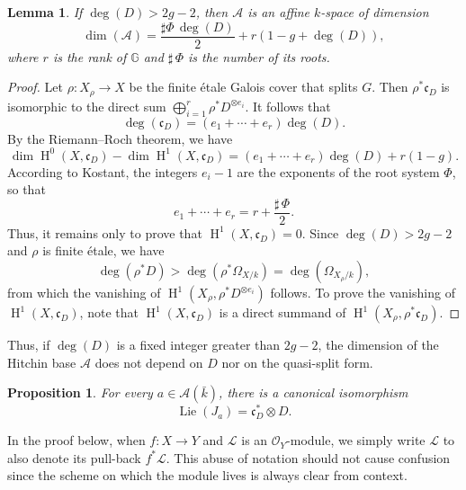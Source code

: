 \documentclass[12pt,english]{smfart}
\numberwithin{equation}{subsection}
\newtheorem{lemma}[equation]{Lemma}
\newtheorem{proposition}[equation]{Proposition}
\theoremstyle{remark}
\begin{document}
\begin{lemma}\label{dim A}
If $\deg(D)>2g-2$, then $\mathcal{A}$ is an affine $k$-space of dimension
$$
\dim(\mathcal{A})=\frac{\sharp\Phi\,\deg(D)}{2}+r(1-g+\deg(D)),
$$
where $r$ is the rank of $\mathbb{G}$ and $\sharp\,\Phi$ is the number of its roots.
\end{lemma}

\begin{proof}
Let $\rho:X_\rho\rightarrow X$ be the finite \'etale Galois cover that splits $G$. Then
$\rho^*\mathfrak{c}_D$ is isomorphic to the direct sum $\bigoplus_{i=1}^r \rho^*D^{\otimes e_i}$.
It follows that
$$
\deg(\mathfrak{c}_D)=(e_1+\cdots+e_r)\deg(D).
$$
By the Riemann--Roch theorem, we have
$$
\dim \operatorname{H}^0 (X,\mathfrak{c}_D)-\dim\operatorname{H}^1(X,\mathfrak{c}_D)=(e_1+\cdots+e_r)\deg(D)+r(1-g).
$$
According to Kostant, the integers $e_i-1$ are the exponents of the root system $\Phi$, so that
$$
e_1+\cdots+e_r=r+\frac{\sharp\,\Phi}{2}.
$$
Thus, it remains only to prove that $\operatorname{H}^1(X,\mathfrak{c}_D)=0$. Since $\deg(D)>2g-2$
and $\rho$ is finite \'etale, we have
$$
\deg(\rho^* D)>\deg (\rho^*\Omega_{X/ k})=\deg(\Omega_{X_\rho/ k}),
$$
from which the vanishing of $\operatorname{H}^1(X_\rho, \rho^*D^{\otimes e_i})$ follows.
To prove the vanishing of $\operatorname{H}^1(X,\mathfrak{c}_D)$, note that $\operatorname{H}^1(X,\mathfrak{c}_D)$
is a direct summand of $\operatorname{H}^1(X_\rho, \rho^*\mathfrak{c}_D)$.
\end{proof}

Thus, if $\deg(D)$ is a fixed integer greater than $2g-2$, the dimension of the Hitchin base $\mathcal{A}$ does not depend on $D$
nor on the quasi-split form.

\begin{proposition}
For every $a\in\mathcal{A}(\bar{k})$, there is a canonical isomorphism
$$
\operatorname{Lie}(J_a)=\mathfrak{c}_D^*\otimes D.
$$
\end{proposition}

In the proof below, when $f:X\rightarrow Y$ and $\mathcal{L}$ is an $\mathcal{O}_Y$-module, we
simply write $\mathcal{L}$ to also denote its pull-back $f^*\mathcal{L}$. This abuse of notation
should not cause confusion since the scheme on which the module lives is always clear from context.
\end{document}
